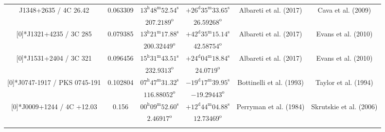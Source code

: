 \begin{landscape}
\begin{longtable}{cccccc}
  \multirow{2}[0]{*}{J1348+2635 / 4C 26.42} & \multirow{2}[0]{*}{0.063309} &  
    $13^\text{h}48^\text{m}52.54^\text{s}$  & $+26^\text{d}35^\text{m}33.65^\text{s}$  & 
    \multirow{2}[0]{*}{Albareti et al. (2017)\cite{RedRef9_2017}}& \multirow{2}[0]{*}{Cava et al. (2009)\cite{CoordRef56_2009}} \\*
    & & $207.2189^\text{o}$ & $26.59268^\text{o}$ & & \\ \addlinespace 

  \multirow{2}[0]{*}{J1321+4235 / 3C 285} & \multirow{2}[0]{*}{0.079385} &  
    $13^\text{h}21^\text{m}17.88^\text{s}$  & $+42^\text{d}35^\text{m}15.14^\text{s}$  & 
    \multirow{2}[0]{*}{Albareti et al. (2017)\cite{RedRef9_2017}}& \multirow{2}[0]{*}{Evans et al. (2010) \cite{CoordRef1_2010}} \\*
    & & $200.32449^\text{o}$ & $42.58754^\text{o}$ & & \\ \addlinespace 


  \multirow{2}[0]{*}{J1531+2404 / 3C 321} & \multirow{2}[0]{*}{0.096456} &  
    $15^\text{h}31^\text{m}43.51^\text{s}$  & $+24^\text{d}04^\text{m}18.84^\text{s}$  & 
    \multirow{2}[0]{*}{Albareti et al. (2017)\cite{RedRef9_2017}}& \multirow{2}[0]{*}{Evans et al. (2010) \cite{CoordRef1_2010}} \\*
    & & $232.9313^\text{o}$ & $24.0719^\text{o}$ & & \\ \addlinespace 

  \multirow{2}[0]{*}{J0747-1917 / PKS 0745-191} & \multirow{2}[0]{*}{0.102804} &  
    $07^\text{h}47^\text{m}31.32^\text{s}$  & $-19^\text{d}17^\text{m}39.95^\text{s}$  & 
    \multirow{2}[0]{*}{Bottinelli et al. (1993)\cite{RedRef1_1993}}& \multirow{2}[0]{*}{Taylor et al. (1994) \cite{CoordRef109_1994}} \\*
    & & $116.88052^\text{o}$ & $-19.29443^\text{o}$ & & \\ \addlinespace 

  \multirow{2}[0]{*}{J0009+1244 / 4C +12.03} & \multirow{2}[0]{*}{0.156} &  
    $00^\text{h}09^\text{m}52.60^\text{s}$  & $+12^\text{d}44^\text{m}04.88^\text{s}$  & 
    \multirow{2}[0]{*}{Perryman et al. (1984)\cite{RedRef111_1984}}& \multirow{2}[0]{*}{Skrutskie et al. (2006)\cite{CoordRef77_2006}} \\*
    & & $2.46917^\text{o}$ & $12.73469^\text{o}$ & & \\ \addlinespace 


\end{longtable}
\end{landscape}

